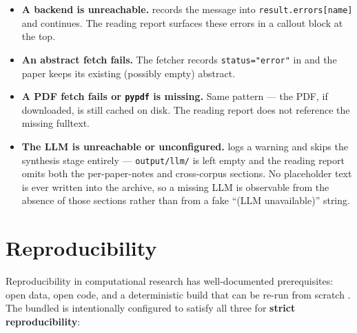 \documentclass[
  english,
]{article}
\providecommand{\tightlist}{%
  \setlength{\itemsep}{0pt}\setlength{\parskip}{0pt}}
\begin{document}
\begin{itemize}
\tightlist
\item
  \textbf{A backend is unreachable.}  records
  the message into \texttt{result.errors{[}name{]}} and continues. The
  reading report surfaces these errors in a callout block at the top.
\item
  \textbf{An abstract fetch fails.} The fetcher records
  \texttt{status="error"} in  and the paper
  keeps its existing (possibly empty) abstract.
\item
  \textbf{A PDF fetch fails or \texttt{pypdf} is missing.} Same pattern
  --- the PDF, if downloaded, is still cached on disk. The reading
  report does not reference the missing fulltext.
\item
  \textbf{The LLM is unreachable or unconfigured.}
   logs a warning and skips the
  synthesis stage entirely --- \texttt{output/llm/} is left empty and
  the reading report omits both the per-paper-notes and cross-corpus
  sections. No placeholder text is ever written into the archive, so a
  missing LLM is observable from the absence of those sections rather
  than from a fake ``(LLM unavailable)'' string.
\end{itemize}

\newpage

\section{Reproducibility}\label{sec:reproducibility}

Reproducibility in computational research has well-documented
prerequisites: open data, open code, and a deterministic build that can
be re-run from scratch \citep{peng2011reproducible}. The bundled
 is intentionally configured to satisfy
all three for \textbf{strict reproducibility}:
\end{document}
